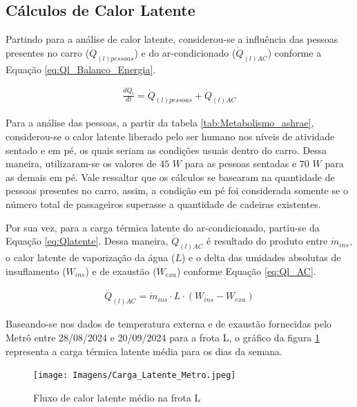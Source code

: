 \documentclass[acronym,symbols,table]{fei}
\begin{document}
\subsection{Cálculos de Calor Latente}

Partindo para a análise de calor latente, considerou-se a influência das pessoas presentes no carro ($\dot{Q}_{(l)pessoas}$) e do ar-condicionado ($\dot{Q}_{(l)AC}$) conforme a Equação \ref{eq:Ql_Balanco_Energia}.

\begin{equation} \label{eq:Ql_Balanco_Energia}
    \begin{aligned}
    \frac{dQ_{l}}{dt}=\dot{Q}_{(l)pessoas} + \dot{Q}_{(l)AC}
    \end{aligned}
\end{equation}

Para a análise das pessoas, a partir da tabela \ref{tab:Metabolismo_ashrae}, considerou-se o calor latente liberado pelo ser humano nos níveis de atividade sentado e em pé, os quais seriam as condições usuais dentro do carro. Dessa maneira, utilizaram-se os valores de $45$ $W$ para as pessoas sentadas e $70$ $W$ para as demais em pé. Vale ressaltar que os cálculos se basearam na quantidade de pessoas presentes no carro, assim, a condição em pé foi considerada somente se o número total de passageiros superasse a quantidade de cadeiras existentes.

Por sua vez, para a carga térmica latente do ar-condicionado, partiu-se da Equação \ref{eq:Qlatente}. Dessa maneira, $\dot{Q}_{(l)AC}$ é resultado do produto entre $\dot{m}_{ins}$, o calor latente de vaporização da água ($L$) e o delta das umidades absolutas de insuflamento ($W_{ins}$) e de exaustão ($W_{exa}$) conforme Equação \ref{eq:Ql_AC}.

\begin{equation} \label{eq:Ql_AC}
    \begin{aligned}
    \dot{Q}_{(l)AC}=\dot{m}_{ins} \cdot L \cdot (W_{ins}-W_{exa})
    \end{aligned}
\end{equation} 

Baseando-se nos dados de temperatura externa e de exaustão fornecidas pelo Metrô entre 28/08/2024 e 20/09/2024 para a frota L, o gráfico da figura \ref{fig:Carga_Latente_Metro} representa a carga térmica latente média para os dias da semana.

\begin{figure}[!htb]
    \centering
    \caption{Fluxo de calor latente médio na frota L}
    \texttt{[image: Imagens/Carga\_Latente\_Metro.jpeg]}
    \label{fig:Carga_Latente_Metro}
\end{figure}
\newpage
\end{document}
